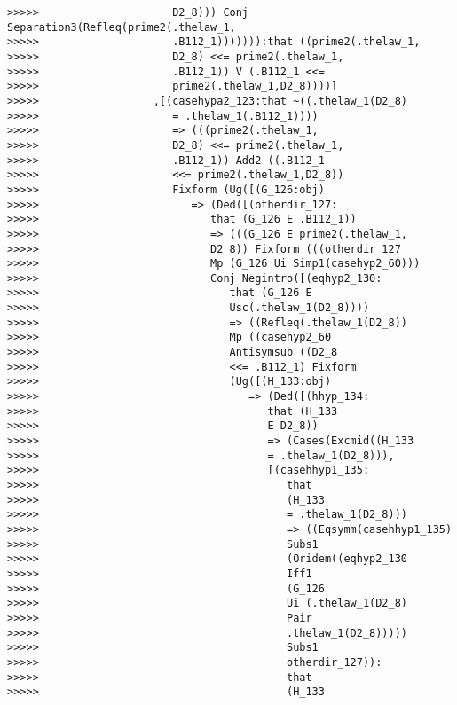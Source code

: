 \documentclass[12pt]{article}
\begin{document}
\begin{verbatim}
>>>>>                     D2_8))) Conj Separation3(Refleq(prime2(.thelaw_1,
>>>>>                     .B112_1))))))):that ((prime2(.thelaw_1,
>>>>>                     D2_8) <<= prime2(.thelaw_1,
>>>>>                     .B112_1)) V (.B112_1 <<=
>>>>>                     prime2(.thelaw_1,D2_8))))]
>>>>>                  ,[(casehypa2_123:that ~((.thelaw_1(D2_8)
>>>>>                     = .thelaw_1(.B112_1))))
>>>>>                     => (((prime2(.thelaw_1,
>>>>>                     D2_8) <<= prime2(.thelaw_1,
>>>>>                     .B112_1)) Add2 ((.B112_1
>>>>>                     <<= prime2(.thelaw_1,D2_8))
>>>>>                     Fixform (Ug([(G_126:obj)
>>>>>                        => (Ded([(otherdir_127:
>>>>>                           that (G_126 E .B112_1))
>>>>>                           => (((G_126 E prime2(.thelaw_1,
>>>>>                           D2_8)) Fixform (((otherdir_127
>>>>>                           Mp (G_126 Ui Simp1(casehyp2_60)))
>>>>>                           Conj Negintro([(eqhyp2_130:
>>>>>                              that (G_126 E
>>>>>                              Usc(.thelaw_1(D2_8))))
>>>>>                              => ((Refleq(.thelaw_1(D2_8))
>>>>>                              Mp ((casehyp2_60
>>>>>                              Antisymsub ((D2_8
>>>>>                              <<= .B112_1) Fixform
>>>>>                              (Ug([(H_133:obj)
>>>>>                                 => (Ded([(hhyp_134:
>>>>>                                    that (H_133
>>>>>                                    E D2_8))
>>>>>                                    => (Cases(Excmid((H_133
>>>>>                                    = .thelaw_1(D2_8))),
>>>>>                                    [(casehhyp1_135:
>>>>>                                       that
>>>>>                                       (H_133
>>>>>                                       = .thelaw_1(D2_8)))
>>>>>                                       => ((Eqsymm(casehhyp1_135)
>>>>>                                       Subs1
>>>>>                                       (Oridem((eqhyp2_130
>>>>>                                       Iff1
>>>>>                                       (G_126
>>>>>                                       Ui (.thelaw_1(D2_8)
>>>>>                                       Pair
>>>>>                                       .thelaw_1(D2_8)))))
>>>>>                                       Subs1
>>>>>                                       otherdir_127)):
>>>>>                                       that
>>>>>                                       (H_133

\end{verbatim}
\end{document}
